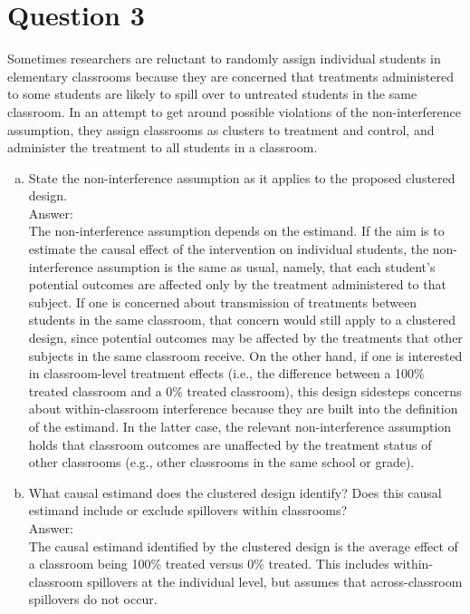 \documentclass[11pt,notitlepage]{article}\usepackage[]{graphicx}\usepackage[]{color}
\begin{document}
\section*{Question 3}
Sometimes researchers are reluctant to randomly assign individual students in elementary classrooms because they are concerned that treatments administered to some students are likely to spill over to untreated students in the same classroom. In an attempt to get around possible violations of the non-interference assumption, they assign classrooms as clusters to treatment and control, and administer the treatment to all students in a classroom.
\begin{enumerate}[a)]
\item State the non-interference assumption as it applies to the proposed clustered design. \\
Answer:\\
The non-interference assumption depends on the estimand. If the aim is to estimate the causal effect of the intervention on individual students, the non-interference assumption is the same as usual, namely, that each student's potential outcomes are affected only by the treatment administered to that subject. If one is concerned about transmission of treatments between students in the same classroom, that concern would still apply to a clustered design, since potential outcomes may be affected by the treatments that other subjects in the same classroom receive. On the other hand, if one is interested in classroom-level treatment effects (i.e., the difference between a 100\% treated classroom and a 0\% treated classroom), this design sidesteps concerns about within-classroom interference because they are built into the definition of the estimand. In the latter case, the relevant non-interference assumption holds that classroom outcomes are unaffected by the treatment status of other classrooms (e.g., other classrooms in the same school or grade).
\item What causal estimand does the clustered design identify? Does this causal estimand include or exclude spillovers within classrooms?\\
Answer:\\
The causal estimand identified by the clustered design is the average effect of a classroom being 100\% treated versus 0\% treated. This includes within-classroom spillovers at the individual level, but assumes that across-classroom spillovers do not occur.
\end{enumerate}
\end{document}
